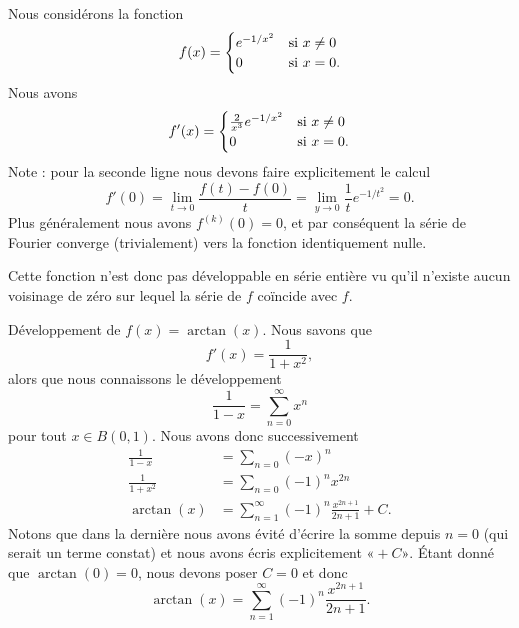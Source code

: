 \begin{example}
    Nous considérons la fonction
    \begin{equation}
        f(x)=\begin{cases}
            e^{-1/x^2}    &   \text{si \( x\neq 0\)}\\
            0    &    \text{si \( x=0\).}
        \end{cases}
    \end{equation}
    Nous avons
    \begin{equation}
        f'(x)=\begin{cases}
            \frac{ 2 }{ x^3 } e^{-1/x^2}    &   \text{si \( x\neq 0\)}\\
            0    &    \text{si \( x=0\)}.
        \end{cases}
    \end{equation}
    Note : pour la seconde ligne nous devons faire explicitement le calcul
    \begin{equation}
        f'(0)=\lim_{t\to 0} \frac{ f(t)-f(0) }{ t }=\lim_{y\to 0} \frac{1}{ t } e^{-1/t^2}=0.
    \end{equation}
    Plus généralement nous avons \( f^{(k)}(0)=0\), et par conséquent la série de Fourier converge (trivialement) vers la fonction identiquement nulle.

    Cette fonction n'est donc pas développable en série entière vu qu'il n'existe aucun voisinage de zéro sur lequel la série de \( f\) coïncide avec \( f\).
\end{example}

\begin{example}     \label{ExwobBAW}
    Développement de \( f(x)=\arctan(x)\). Nous savons que
    \begin{equation}
        f'(x)=\frac{1}{ 1+x^2 },
    \end{equation}
    alors que nous connaissons le développement
    \begin{equation}
        \frac{1}{ 1-x }=\sum_{n=0}^{\infty}x^n
    \end{equation}
    pour tout \( x\in B(0,1)\). Nous avons donc successivement
    \begin{subequations}
        \begin{align}
            \frac{1}{ 1-x }&=\sum_{n=0}(-x)^n\\
            \frac{ 1 }{ 1+x^2 }&=\sum_{n=0}(-1)^nx^{2n}\\
            \arctan(x)&=\sum_{n=1}^{\infty}(-1)^n\frac{ x^{2n+1} }{ 2n+1 }+C.
        \end{align}
    \end{subequations}
    Notons que dans la dernière nous avons évité d'écrire la somme depuis \( n=0\) (qui serait un terme constat) et nous avons écris explicitement \( «+C» \). Étant donné que \( \arctan(0)=0\), nous devons poser \( C=0\) et donc
    \begin{equation}
        \arctan(x)=\sum_{n=1}^{\infty}(-1)^n\frac{ x^{2n+1} }{ 2n+1 }.
    \end{equation}
\end{example}

